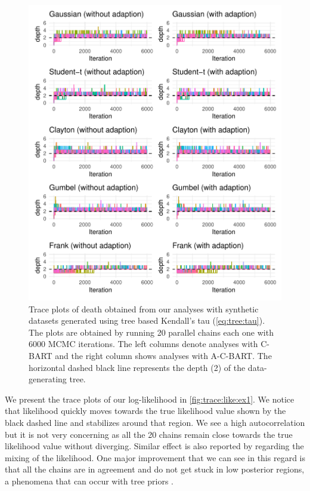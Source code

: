 \documentclass{amsart}
\begin{document}
\begin{figure}
	\centering
	\includegraphics[width = 0.95\linewidth]{"case_1_depth.pdf"}
	\caption{Trace plots of death obtained from our analyses with synthetic datasets generated using tree based Kendall's tau (\cref{eq:tree:tau}). The plots are obtained by running 20 parallel chains each one with 6000 MCMC iterations. The left columns denote analyses with C-BART and the right column shows analyses with A-C-BART. The horizontal dashed black line represents the depth (2) of the data-generating tree.}
	\label{fig:trace:depth:ex1}
\end{figure}

We present the trace plots of our log-likelihood in \cref{fig:trace:like:ex1}. We notice that likelihood quickly moves towards the true likelihood value shown by the black dashed line and stabilizes around that region. We see a high autocorrelation but it is not very concerning as all the 20 chains remain close towards the true likelihood value without diverging. Similar effect is also reported by \citet{Linero02012025} regarding the mixing of the likelihood. One major improvement that we can see in this regard is that all the chains are in agreement and do not get stuck in low posterior regions, a phenomena that can occur with tree priors \cite{chipman98BCART}. 
\end{document}
